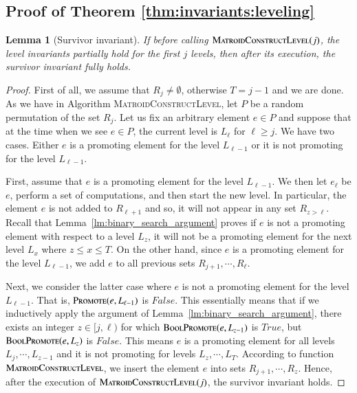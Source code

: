 \documentclass[11pt]{article}
\newtheorem{lemma}[theorem]{Lemma}
\newcommand{\suit}{\textsc{Promote}}
\newcommand{\boolsuit}{\textsc{BoolPromote}}
\newcommand{\MatroidConstLevel}{\textsc{MatroidConstructLevel}}
\begin{document}
\subsection{Proof of Theorem \ref{thm:invariants:leveling}}
\label{subs:thm:invariants:levelin}
\begin{lemma}[Survivor invariant]
\label{lm:survivor:leveling}
If before calling $\MatroidConstLevel{}(j)$, the level invariants partially hold for the first $j$ levels,
then after its execution, the survivor invariant fully holds.
\end{lemma}


\begin{proof} 

First of all, we assume that $R_j \neq \emptyset$, otherwise $T = j-1$ and we are done. 
As we have in Algorithm \MatroidConstLevel{}, let $P$ be a random permutation of the set $R_j$. 
Let us fix an arbitrary element $e \in P$ and suppose that 
at the time when we see $e \in P$, the current level is $L_{\ell}$ for $\ell \ge j$. 
We have two cases. 
Either $e$ is a promoting element for the level $L_{\ell-1}$ or it is not promoting for the level $L_{\ell-1}$. 

First, assume that $e$ is a promoting element for the level $L_{\ell-1}$. 
We then let $e_{\ell}$ be $e$, perform a set of computations, and then start the new level. 
In particular, the element $e$ is not added to $R_{\ell+1}$ and so, it will not appear in any set $R_{z > \ell}$.
Recall that Lemma~\ref{lm:binary_search_argument} proves if $e$ 
is not a promoting element with respect to a level $L_{z}$, 
it will not be a promoting element for the next level $L_{x}$ where $z\le x \le T$.
On the other hand, since $e$ is a promoting element for the level $L_{\ell-1}$, 
we add $e$ to all previous sets $R_{j+1},\cdots, R_{\ell}$. 

Next, we consider the latter case where $e$ is not a promoting element for the level $L_{\ell-1}$. 
That is, $\suit(e,L_{\ell-1})$ is $False$.
This essentially means that if we inductively apply the argument of Lemma~\ref{lm:binary_search_argument}, 
there exists an integer $z \in [j,\ell)$ for which 
$\boolsuit(e,L_{z-1})$ is $True$, but $\boolsuit(e,L_{z})$ is $False$. 
This means $e$ is a promoting element for all levels $L_j,\cdots,L_{z-1}$ and 
it is not promoting for levels $L_{z},\cdots,L_T$. 
According to function $\MatroidConstLevel$, 
we insert the element $e$ into sets $R_{j+1}, \cdots, R_{z}$. 
Hence, after the execution of $\MatroidConstLevel{}(j)$, 
the survivor invariant holds. 
\end{proof}
\end{document}
